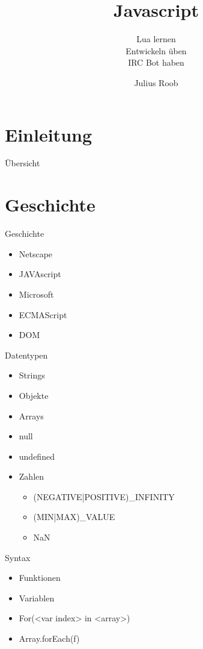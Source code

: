\documentclass{beamer}
\author{Julius Roob}
\title{Javascript}
\subtitle{Lua lernen \checked\\Entwickeln üben \checked\\IRC Bot haben \checked}
\institute{Chaos inKL.}
\date{}
\begin{document}
	\section{Einleitung}
		\begin{frame}
			\titlepage
		\end{frame}
	
		\begin{frame}{Übersicht}
			\tableofcontents
		\end{frame}
	
	
	\section{Geschichte}
		\begin{frame}{Geschichte}{}
			\begin{itemize}
				\item Netscape
				\item JAVAscript
				\item Microsoft
				\item ECMAScript
				\item DOM
			\end{itemize}
		\end{frame}

		\begin{frame}{Datentypen}{}
			\begin{itemize}
				\item Strings
				\item Objekte
				\item Arrays
				\item null
				\item undefined
				\item Zahlen
					\begin{itemize}
						\item (NEGATIVE|POSITIVE)_INFINITY
						\item (MIN|MAX)_VALUE
						\item NaN
					\end{itemize}
			\end{itemize}
		\end{frame}

		\begin{frame}[fragile,shrink=5]{Syntax}
			\begin{itemize}
				\item Funktionen
				\item Variablen
				\item For(<var index> in <array>){}
				\item Array.forEach(f)
			\end{itemize}
		\end{frame}
		
\end{document}
